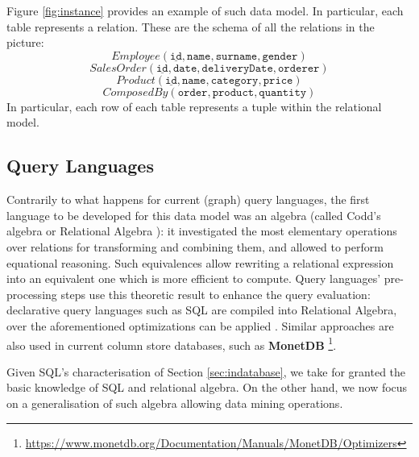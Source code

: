 \begin{example}
Figure \ref{fig:instance} provides an example of such data model. In particular, each table represents a relation. These are the schema of all the relations in the picture:
\[Employee(\underline{\texttt{id}},\texttt{name},\texttt{surname},\texttt{gender})\]
\[SalesOrder(\underline{\texttt{id}},\texttt{date},\texttt{deliveryDate},\texttt{orderer})\]
\[Product(\underline{\texttt{id}},\texttt{name},\texttt{category},\texttt{price})\]
\[ComposedBy(\texttt{order},\texttt{product},\texttt{quantity})\]
In particular, each row of each table represents a tuple within the relational model. 
\end{example}

\subsection{Query Languages}
Contrarily to what happens for current (graph) query languages, the first language to be developed for this data model was an algebra (called Codd's algebra or Relational Algebra \cite{atzeni,atzeniIT,Elmasri}): it investigated the most elementary operations over relations for transforming and combining them, and allowed to perform equational reasoning.  Such equivalences allow rewriting a relational expression into an equivalent one which is more efficient to compute. Query languages' pre-processing steps use this theoretic result to enhance the query evaluation: declarative query languages such as SQL are compiled into Relational Algebra, over the aforementioned optimizations can be applied \cite{ceri1985}. Similar approaches are also used in current column store databases, such as \textbf{MonetDB} \footnote{\url{https://www.monetdb.org/Documentation/Manuals/MonetDB/Optimizers}}.

Given SQL's characterisation of Section \ref{sec:indatabase}, we take for granted the basic knowledge of SQL and relational algebra. On the other hand, we now focus on a generalisation of such algebra allowing data mining operations.


